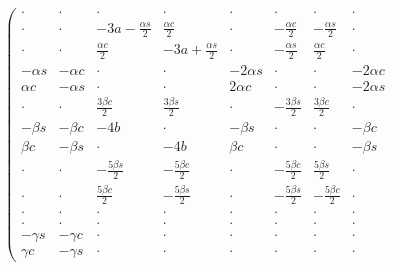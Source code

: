 \documentclass[a4paper,10pt,leqno]{article}
\numberwithin{equation}{section}
\theoremstyle{plain}
\theoremstyle{definition}
\theoremstyle{remark}
\begin{document}
\begin{align} 
\left(\begin{matrix}
\cdot&\cdot&\cdot&\cdot&\cdot&\cdot&\cdot&\cdot\\
\cdot&\cdot&-3a-\frac{\alpha s}{2}&\frac{\alpha c}{2}&\cdot&-\frac{\alpha c}{2}&-\frac{\alpha s}{2}&\cdot\\
\cdot&\cdot&\frac{\alpha c}{2}&-3a+\frac{\alpha s}{2}&\cdot&-\frac{\alpha s}{2}&\frac{\alpha c}{2}&\cdot\\
-\alpha s&-\alpha c&\cdot&\cdot&-2\alpha s&\cdot&\cdot&-2\alpha c\\
\alpha c&-\alpha s&\cdot&\cdot&2\alpha c&\cdot&\cdot&-2\alpha s\\
\cdot&\cdot&\frac{3\beta c}{2}&\frac{3\beta s}{2}&\cdot&-\frac{3\beta s}{2}&\frac{3\beta c}{2}&\cdot\\
-\beta s&-\beta c&-4b&\cdot&-\beta s&\cdot&\cdot&-\beta c\\
\beta c&-\beta s&\cdot&-4b&\beta c&\cdot&\cdot&-\beta s\\
\cdot&\cdot&-\frac{5\beta s}{2}&-\frac{5\beta c}{2}&\cdot&-\frac{5\beta c}{2}&\frac{5\beta s}{2}&\cdot\\
\cdot&\cdot&\frac{5\beta c}{2}&-\frac{5\beta s}{2}&\cdot&-\frac{5\beta s}{2}&-\frac{5\beta c}{2}&\cdot\\
\cdot&\cdot&\cdot&\cdot&\cdot&\cdot&\cdot&\cdot\\
\cdot&\cdot&\cdot&\cdot&\cdot&\cdot&\cdot&\cdot\\
-\gamma s&-\gamma c&\cdot&\cdot&\cdot&\cdot&\cdot&\cdot\\
\gamma c&-\gamma s&\cdot&\cdot&\cdot&\cdot&\cdot&\cdot
\end{matrix}\right.
\end{align} 
\end{document}
